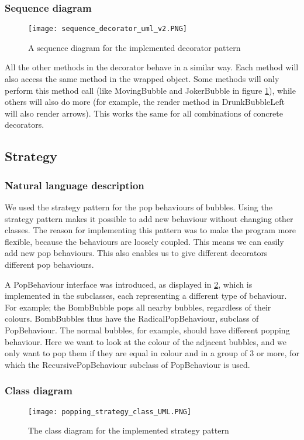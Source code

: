\documentclass[a4paper]{article}
\begin{document}
\subsubsection{Sequence diagram}
\begin{figure}[H]
    \texttt{[image: sequence\_decorator\_uml\_v2.PNG]}
    \caption{\label{fig:seq_strategy} A sequence diagram for the implemented decorator pattern}
\end{figure}
All the other methods in the decorator behave in a similar way. Each method will also access the same method in the wrapped object. Some methods will only perform this method call (like MovingBubble and JokerBubble in figure \ref{fig:seq_strategy}), while others will also do more (for example, the render method in DrunkBubbleLeft will also render arrows). This works the same for all combinations of concrete decorators.

\subsection{Strategy}

\subsubsection{Natural language description}
We used the strategy pattern for the pop behaviours of bubbles. Using the strategy pattern makes it possible to add new behaviour without changing other classes. The reason for implementing this pattern was to make the program more flexible, because the behaviours are loosely coupled. This means we can easily add new pop behaviours. This also enables us to give different decorators different pop behaviours.

A PopBehaviour interface was introduced, as displayed in \ref{fig:class_strategy}, which is implemented in the subclasses, each representing a different type of behaviour. For example; the BombBubble pops all nearby bubbles, regardless of their colours. BombBubbles thus have the RadicalPopBehaviour, subclass of PopBehaviour. The normal bubbles, for example, should have different popping behaviour. Here we want to look at the colour of the adjacent bubbles, and we only want to pop them if they are equal in colour and in a group of 3 or more, for which the RecursivePopBehaviour subclass of PopBehaviour is used.

\subsubsection{Class diagram}
\begin{figure}[H]
    \texttt{[image: popping\_strategy\_class\_UML.PNG]}
    \caption{\label{fig:class_strategy} The class diagram for the implemented strategy pattern}
\end{figure}
\end{document}
